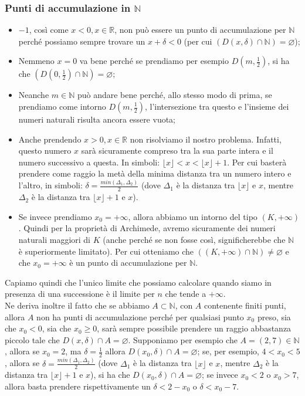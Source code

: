 \documentclass{article}
\begin{document}
\subsubsection{Punti di accumulazione in $\mathbb{N}$}
\begin{itemize}
    \item $-1$, così come $x < 0, x \in \mathbb{R}$, non può essere un punto di accumulazione per $\mathbb{N}$ perché possiamo sempre trovare un $x +\delta < 0$ (per cui $(D(x, \delta) \cap \mathbb{N}) = \varnothing$);
    \item Nemmeno $x = 0$ va bene perché se prendiamo per esempio $D(m, \frac{1}{2})$, si ha che $(D(0, \frac{1}{2}) \cap \mathbb{N}) = \varnothing$;
    \item Neanche $m \in \mathbb{N}$ può andare bene perché, allo stesso modo di prima, se prendiamo come intorno $D(m, \frac{1}{2})$, l'intersezione tra questo e l'insieme dei numeri naturali risulta ancora essere vuota;
    \item Anche prendendo $x > 0, x \in \mathbb{R}$ non risolviamo il nostro problema. Infatti, questo numero $x$ sarà sicuramente compreso tra la sua parte intera e il numero successivo a questa. In simboli: $\lfloor x \rfloor < x < \lfloor x \rfloor + 1$. Per cui basterà prendere come raggio la metà della minima distanza tra un numero intero e l'altro, in simboli: $\delta = \frac{min(\Delta_1, \Delta_2)}{2}$ (dove $\Delta_1$ è la distanza tra $\lfloor x \rfloor$ e $x$, mentre $\Delta_2$ è la distanza tra $\lfloor x \rfloor + 1$ e $x$).
    \item Se invece prendiamo $x_0 = +\infty$, allora abbiamo un intorno del tipo $(K, +\infty)$. Quindi per la proprietà di Archimede, avremo sicuramente dei numeri naturali maggiori di $K$ (anche perché se non fosse così, significherebbe che $\mathbb{N}$ è superiormente limitato). Per cui otteniamo che $((K, + \infty) \cap \mathbb{N}) \neq \varnothing$ e che $x_0 = +\infty$ è un punto di accumulazione per $\mathbb{N}$.
\end{itemize}

\noindent Capiamo quindi che l'unico limite che possiamo calcolare quando siamo in presenza di una successione è il limite per $n$ che tende a $+\infty$.\\

\noindent Ne deriva inoltre il fatto che se abbiamo $A \subset \mathbb{N}$, con $A$ contenente finiti punti, allora $A$ non ha punti di accumulazione perché per qualsiasi punto $x_0$ preso, sia che $x_0 < 0$, sia che $x_0 \geq 0$, sarà sempre possibile prendere un raggio abbastanza piccolo tale che $D(x, \delta) \cap A = \varnothing$. Supponiamo per esempio che $A = (2, 7) \in \mathbb{N}$, allora se $x_0 = 2$, ma $\delta = \frac{1}{2}$ allora $D(x_0, \delta) \cap A = \varnothing$; se, per esempio, $4 < x_0 < 5$, allora se $\delta = \frac{min(\Delta_1, \Delta_2)}{2}$ (dove $\Delta_1$ è la distanza tra $\lfloor x \rfloor$ e $x$, mentre $\Delta_2$ è la distanza tra $\lfloor x \rfloor + 1$ e $x$), si ha che $D(x_0, \delta) \cap A = \varnothing$; se invece $x_0 < 2$ o $x_0 > 7$, allora basta prendere rispettivamente un $\delta < 2 - x_0$ o $\delta < x_0 - 7$.\\
\end{document}

